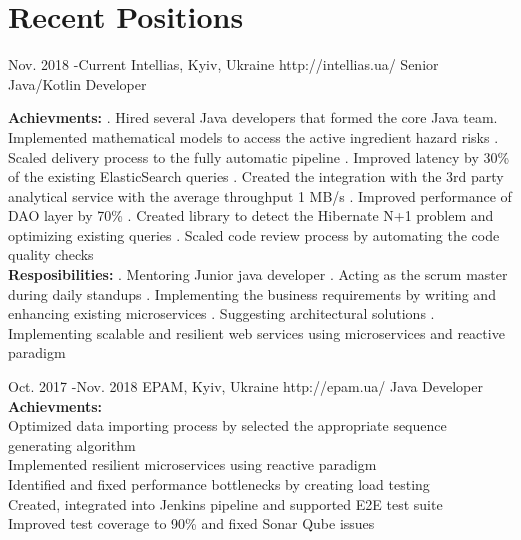 \documentclass[10pt]{article} %
\begin{document}
\section{Recent Positions}
\job
{Nov. 2018 -}{Current}
{Intellias, Kyiv, Ukraine}
{http://intellias.ua/}
{Senior Java/Kotlin Developer}
{
\rule{0mm}{5mm}
\textbf{Achievments:} . Hired several Java developers that formed the core Java team. Implemented mathematical models to access the active ingredient hazard risks . Scaled delivery process to the fully automatic pipeline . Improved latency by 30\% of the existing ElasticSearch queries . Created the integration with the 3rd party analytical service with the average throughput 1 MB/s . Improved performance of DAO layer by 70\%  . Created library to detect the Hibernate N+1 problem and optimizing existing queries . Scaled code review process by automating the code quality checks 
\\ \textbf{Resposibilities:} . Mentoring Junior java developer . Acting as the scrum master during daily standups . Implementing the business requirements by writing and enhancing existing microservices . Suggesting architectural solutions . Implementing scalable and resilient web services using microservices and reactive paradigm
 }
 
\job
{Oct. 2017 -}{Nov. 2018}
{EPAM, Kyiv, Ukraine}
{http://epam.ua/}
{Java Developer}
{
\textbf{Achievments:}  
\\Optimized data importing process by selected the appropriate sequence generating algorithm
\\Implemented resilient microservices using reactive paradigm
\\Identified and fixed performance bottlenecks by creating load testing 
\\Created, integrated into Jenkins pipeline and supported E2E test suite
\\Improved test coverage to 90\% and fixed Sonar Qube issues
 }
\end{document}
